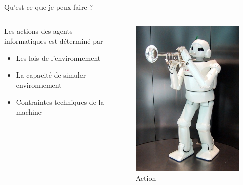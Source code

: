 \documentclass{beamer}
\begin{document}
\begin{frame}{Qu'est-ce que je peux faire ?}
\begin{columns}
\begin{column}{0.6\textwidth}
\begin{block}{}

Les actions des agents informatiques est déterminé par
\begin{itemize}
  \item Les lois de l'environnement
  \item La capacité de simuler environnement 
  \item Contraintes techniques de la machine
\end{itemize}

\end{block}
\end{column}
\begin{column}{0.4\textwidth}
\begin{block}{}
\begin{figure}
    \centering
    \includegraphics[width=\textwidth]{toyotarobot.jpg}
    \caption{Action}
    \label{fig:toyota}
\end{figure}
\end{block}
\end{column}
\end{columns}
\end{frame}
\end{document}
